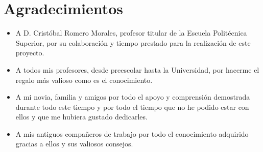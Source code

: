 %
%

\chapter*{Agradecimientos}
\thispagestyle{empty}
\begin{itemize}

	\item A D. Cristóbal Romero Morales, profesor titular de la Escuela Politécnica Superior, por su colaboración y tiempo prestado para la realización de este proyecto.

	\item A todos mis profesores, desde preescolar hasta la Universidad, por hacerme el regalo más valioso como es el conocimiento.

	\item A mi novia, familia y amigos por todo el apoyo y comprensión demostrada durante todo este tiempo y por todo el tiempo que no he podido estar con ellos y que me hubiera gustado dedicarles.

	\item A mis antiguos compañeros de trabajo por todo el conocimiento adquirido gracias a ellos y sus valiosos consejos.

\end{itemize}

\newpage{\pagestyle{empty}\cleardoublepage}